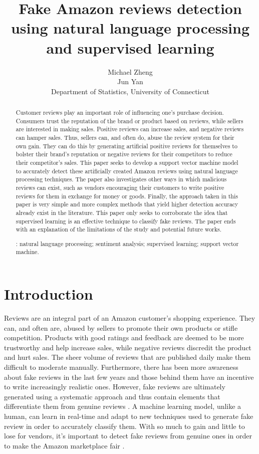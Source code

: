 \documentclass[12pt]{article}
\title{Fake Amazon reviews detection using natural language processing and supervised learning}
\author{Michael Zheng\\
  Jun Yan\\[1ex]
  Department of Statistics, University of Connecticut\\
}
\date{}
\begin{document}
\maketitle
\doublespace

\begin{abstract}
    Customer reviews play an important role of influencing one's purchase decision. Consumers trust the reputation of the brand or product based on reviews, while sellers are interested in making sales. Positive reviews can increase sales, and negative reviews can hamper sales. Thus, sellers can, and often do, abuse the review system for their own gain. They can do this by generating artificial positive reviews for themselves to bolster their brand's reputation or negative reviews for their competitors to reduce their competitor's sales. This paper seeks to develop a support vector machine model to accurately detect these artificially created Amazon reviews using natural language processing techniques. The paper also investigates other ways in which malicious reviews can exist, such as vendors encouraging their customers to write positive reviews for them in exchange for money or goods. Finally, the approach taken in this paper is very simple and more complex methods that yield higher detection accuracy already exist in the literature. This paper only seeks to corroborate the idea that supervised learning is an effective technique to classify fake reviews. The paper ends with an explanation of the limitations of the study and potential future works.
    
\bigskip
{}:
natural language processing;
sentiment analysis;
supervised learning;
support vector machine.

\end{abstract}

\section{Introduction}
\label{sec:intro}

Reviews are an integral part of an Amazon customer's shopping experience. They can, and often are, abused by sellers to promote their own products or stifle competition. Products with good ratings and feedback are deemed to be more trustworthy and help increase sales, while negative reviews discredit the product and hurt sales. The sheer volume of reviews that are published daily make them difficult to moderate manually. Furthermore, there has been more awareness about fake reviews in the last few years and those behind them have an incentive to write increasingly realistic ones. However, fake reviews are ultimately generated using a systematic approach and thus contain elements that differentiate them from genuine reviews \citep{Salminen2022}. A machine learning model, unlike a human, can learn in real-time and adapt to new techniques used to generate fake review in order to accurately classify them. With so much to gain and little to lose for vendors, it's important to detect fake reviews from genuine ones in order to make the Amazon marketplace fair \citep{Salminen2022}.
\end{document}

